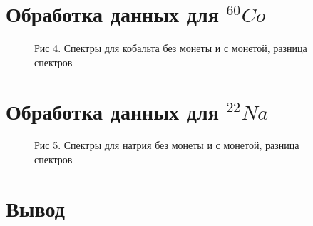 \documentclass[12pt]{article}
\begin{document}
  \newpage
  \section{Обработка данных для $^{60}Co$}

    \begin{figure}[h!]
      \begin{minipage}[h]{0.99\linewidth}
        Рис 4. Спектры для кобальта без монеты и с монетой, разница спектров
      \end{minipage}
      \label{chart:cobalt}
    \end{figure}

  \newpage
  \section{Обработка данных для $^{22}Na$}

    \begin{figure}[h!]
      \begin{minipage}[h]{0.99\linewidth}
        Рис 5. Спектры для натрия без монеты и с монетой, разница спектров
      \end{minipage}
      \label{chart:natrium}
    \end{figure}

  \newpage
  \section{Вывод}
\end{document}
